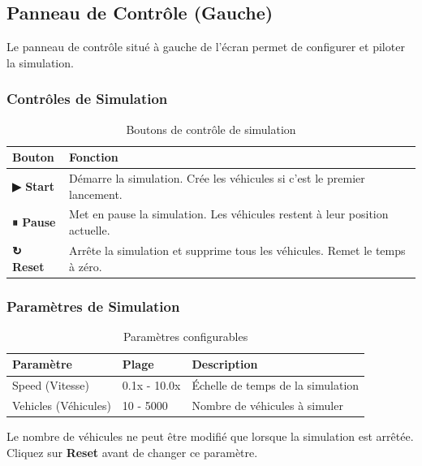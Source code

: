 \documentclass[12pt,a4paper]{article}
\begin{document}
\subsection{Panneau de Contrôle (Gauche)}

Le panneau de contrôle situé à gauche de l'écran permet de configurer et piloter la simulation.

\subsubsection{Contrôles de Simulation}

\begin{table}[H]
\centering
\begin{tabular}{lp{10cm}}
\toprule
\textbf{Bouton} & \textbf{Fonction} \\
\midrule
\textcolor{v2vprimary}{\textbf{▶ Start}} & Démarre la simulation. Crée les véhicules si c'est le premier lancement. \\
\textbf{⏸ Pause} & Met en pause la simulation. Les véhicules restent à leur position actuelle. \\
\textbf{↻ Reset} & Arrête la simulation et supprime tous les véhicules. Remet le temps à zéro. \\
\bottomrule
\end{tabular}
\caption{Boutons de contrôle de simulation}
\end{table}

\subsubsection{Paramètres de Simulation}

\begin{table}[H]
\centering
\begin{tabular}{llp{7cm}}
\toprule
\textbf{Paramètre} & \textbf{Plage} & \textbf{Description} \\
\midrule
Speed (Vitesse) & 0.1x - 10.0x & Échelle de temps de la simulation \\
Vehicles (Véhicules) & 10 - 5000 & Nombre de véhicules à simuler \\
\bottomrule
\end{tabular}
\caption{Paramètres configurables}
\end{table}

\begin{notebox}
Le nombre de véhicules ne peut être modifié que lorsque la simulation est arrêtée. Cliquez sur \textbf{Reset} avant de changer ce paramètre.
\end{notebox}
\end{document}
